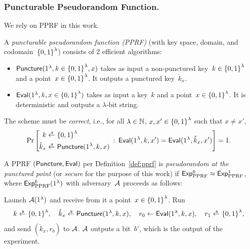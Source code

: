 \subsubsection{Puncturable Pseudorandom Function.}
We rely on PPRF in this work.

\begin{definition}[PPRF]\label{def:pprf}
A \emph{puncturable pseudorandom function (PPRF)} (with key space, domain, and codomain~${\{0,1\}}^\lambda$) consists of 2 efficient algorithms:
\begin{itemize}
\item ${\smash{\mathsf{Puncture}}}(1^\lambda,k\in{\{0,1\}}^\lambda,x)$
takes as input a non-punctured key~${k\in{\{0,1\}}^\lambda}$ and a point~${x\in{\{0,1\}}^\lambda}$.
It outputs a punctured key~$\mathring{k}_x$.
\item ${\smash{\mathsf{Eval}}}(1^\lambda,k,x\in{\{0,1\}}^\lambda)$
takes as input a key~$k$ and a point~${x\in{\{0,1\}}^\lambda}$.
It is deterministic and outputs a $\lambda$-bit string.
\end{itemize}
The scheme must be \emph{correct}, i.e., for all
${\lambda\in{\mathbb{N}}}$,
${x,x'\in{\{0,1\}}^\lambda}$ such that ${x\neq x'}$,
\begin{align*}
\Pr\left[
\begin{aligned}
k&{}\draws\bit^\lambda\\
\mathring{k}_x&{}\draws\Puncture(1^\lambda,k,x)
\end{aligned}
\::\:
\Eval(1^\lambda,k,x')
=
\Eval(1^\lambda,\mathring{k}_x,x')
\right]=1.
\end{align*}
\end{definition}

\begin{definition}\label{def:pprf-security}
A PPRF $({\smash{\mathsf{Puncture}}},{\smash{\mathsf{Eval}}})$ per Definition~\ref{def:pprf} is \emph{pseudorandom at the punctured point} (or \emph{secure} for the purpose of this work)
if ${{\smash{\mathsf{Exp}}_{\textup{PPRF}}^{0}}\approx{\smash{\mathsf{Exp}}_{\textup{PPRF}}^{1}}}$,
where ${\smash{\mathsf{Exp}}_{\textup{PPRF}}^{b}}(1^\lambda)$ with adversary~${\mathcal{A}}$ proceeds as follows:
\begin{security}
Launch ${\mathcal{A}}(1^\lambda)$ and receive from it a point~${x\in{\{0,1\}}^\lambda}$.
Run
\begin{align*}
\WideNarrow{}{\hspace*{-1.2em}}
k\draws\bit^\lambda,\quad
\mathring{k}_x\draws\Puncture(1^\lambda,k,x),\quad
r_0\gets\Eval(1^\lambda,k,x),\quad
r_1\draws\bit^\lambda,
\end{align*}
and send $(\mathring{k}_x,r_b)$ to ${\mathcal{A}}$.
${\mathcal{A}}$ outputs a bit~$b'$, which is the output of the experiment.
\end{security}
\end{definition}

